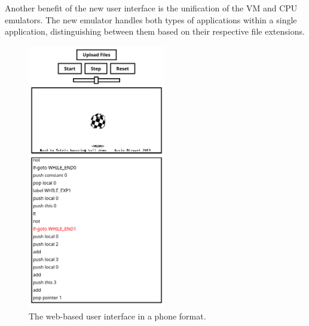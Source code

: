 Another benefit of the new user interface is the unification of the VM and CPU emulators.
The new emulator handles both types of applications within a single application, distinguishing between them based on their respective file extensions.
\begin{center}
  \begin{figure}[ht]
    \centering
    \includegraphics[width=6cm]{fig/ui-demo-mobile.png}
    \caption{The web-based user interface in a phone format.}%
    \label{fig:ui-demo-mobile}
  \end{figure}
\end{center}

